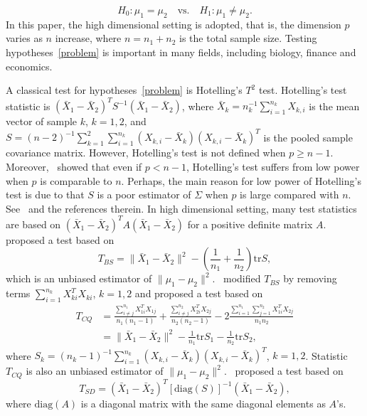 \documentclass[review]{elsarticle}
\theoremstyle{plain}
\theoremstyle{definition}
\theoremstyle{remark}
\begin{document}
\begin{equation}\label{problem}
    H_0:\mu_1=\mu_2\quad \textrm{vs.}\quad H_1:\mu_1\neq \mu_2.
\end{equation}
 In this paper, {the} high dimensional setting is adopted, that is, the dimension $p$ varies as $n$ increase, where $n=n_1+n_2$ is the total sample size.
Testing hypotheses~\eqref{problem} is important in many fields, including biology, finance and economics.


A classical test for hypotheses~\eqref{problem} is Hotelling's $T^2$ test.
Hotelling's test statistic is ${(\bar{X}_1-\bar{X}_2)}^T S^{-1}(\bar{X}_1-\bar{X}_2)$, where $\bar{X}_k=n_k^{-1}\sum_{i=1}^{n_k}X_{k,i}$ is the mean vector of sample $k$, $k=1,2$, and
    $
    S=
{(n-2)}^{-1}\sum_{k=1}^2\sum_{i=1}^{n_k} (X_{k,i}-\bar{X}_k) {(X_{k,i}-\bar{X}_k)}^T
    $
is the pooled sample covariance matrix.
However, Hotelling's test is not defined when $p\geq n-1$.
Moreover,~\cite{Bai1996Efiect} showed that even if $p<n-1$, Hotelling's test suffers from low power when $p$ is comparable to $n$.
Perhaps, the main reason for low power of Hotelling's test is due to that $S$ is a poor estimator of $\Sigma$ when $p$ is large compared with $n$. See~\cite{Chen2010A} and the references therein.
In high dimensional setting,  
many test statistics are based on ${(\bar{X}_1-\bar{X}_2)}^T A(\bar{X}_1-\bar{X}_2)$ for a positive definite matrix $A$.~\cite{Bai1996Efiect} proposed a test based on
\begin{equation*}
    T_{BS}=\|\bar{X}_1-\bar{X}_2\|^2-(\frac{1}{n_1}+\frac{1}{n_2})\mathrm{tr}S,
\end{equation*}
which is an unbiased estimator of $\|\mu_1-\mu_2\|^2$.~\cite{Chen2010A} modified $T_{BS}$ by removing terms $\sum_{i=1}^{n_k}X_{ki}^T X_{ki}$, $k=1,2$ and proposed a test based on
\begin{equation*}
    \begin{aligned}
        T_{CQ}&=\frac{\sum_{i\neq j}^{n_1}X_{1i}^T X_{1j}}{n_1(n_1-1)}+\frac{\sum_{i\neq j}^{n_2}X_{2i}^T X_{2j}}{n_2(n_2-1)}-2\frac{\sum_{i=1}^{n_1}\sum_{j=1}^{n_2}X_{1i}^T X_{2j}}{n_1n_2}
        \\
            &=\|\bar{X}_1-\bar{X}_2\|^2-\frac{1}{n_1}\mathrm{tr}S_1-\frac{1}{n_2}\mathrm{tr}S_2,
    \end{aligned}
\end{equation*}
where
$S_k={(n_k -1)}^{-1}\sum_{i=1}^{n_k} (X_{k,i}-\bar{X}_k) {(X_{k,i}-\bar{X}_k)}^T
$, $k=1,2$.
 Statistic $T_{CQ}$ 
is also an unbiased estimator of $\|\mu_1-\mu_2\|^2$.~\cite{Srivastava2008A} proposed a test based on
\begin{equation*}
    T_{SD}={(\bar{X}_1-\bar{X}_2)}^T {[\mathrm{diag}(S)]}^{-1}(\bar{X}_1-\bar{X}_2),
\end{equation*}
where $\textrm{diag} (A)$ is a diagonal matrix with the same diagonal elements as $A$'s.
\end{document}
